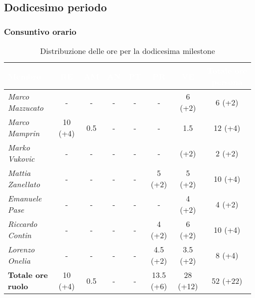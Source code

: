 \subsection{Dodicesimo periodo}
\subsubsection{Consuntivo orario}
\begin{table}[H]
    \renewcommand\arraystretch{1.5}
    \small
    \centering
        \begin{tabular}{|l|c|c|c|c|c|c|c|}
            \hline
            \rowcolor[HTML]{036400}
            \textcolor{white}{\textbf{Membro}} & \multicolumn{1}{c|}{\textcolor{white}{\textbf{RE}}} & \multicolumn{1}{c|}{\textcolor{white}{\textbf{AM}}} & \multicolumn{1}{c|}{\textcolor{white}{\textbf{AN}}} & \multicolumn{1}{c|}{\textcolor{white}{\textbf{PT}}} & \multicolumn{1}{c|}{\textcolor{white}{\textbf{PR}}} & \multicolumn{1}{c|}{\textcolor{white}{\textbf{VE}}} & \multicolumn{1}{c|}{\textcolor{white}{\textbf{Totale ore persona}}} \\ \hline
            \rowcolor[HTML]{EFEFEF}\textit{Marco Mazzucato}  & -         & -        & -          & -        & -         & 6 (+2)       & 6 (+2)    \\ \hline
            \rowcolor[HTML]{C0C0C0}\textit{Marco Mamprin}    & 10 (+4)   & 0.5      & -          & -        & -         & 1.5          & 12 (+4)  \\ \hline
            \rowcolor[HTML]{EFEFEF}\textit{Marko Vukovic}    & -         & -        & -          & -        & -         & (+2)         & 2 (+2)           \\ \hline
            \rowcolor[HTML]{C0C0C0}\textit{Mattia Zanellato} & -         & -        & -          & -        & 5 (+2)    & 5 (+2)       & 10 (+4)      \\ \hline
            \rowcolor[HTML]{EFEFEF}\textit{Emanuele Pase}    & -         & -        & -          & -        & -         & 4 (+2)       & 4 (+2)      \\ \hline
            \rowcolor[HTML]{C0C0C0}\textit{Riccardo Contin}  & -         & -        & -          & -        & 4 (+2)    & 6 (+2)       & 10 (+4)           \\ \hline
            \rowcolor[HTML]{EFEFEF}\textit{Lorenzo Onelia}   & -         & -        & -          & -        & 4.5 (+2)  & 3.5 (+2)     & 8 (+4)        \\ \hline
            \rowcolor[HTML]{C0C0C0}\textbf{Totale ore ruolo} & 10 (+4)   & 0.5      & -          & -        & 13.5 (+6) & 28 (+12)     & 52 (+22)   \\ \hline
        \end{tabular}
    \caption{Distribuzione delle ore per la dodicesima milestone}
\end{table}


